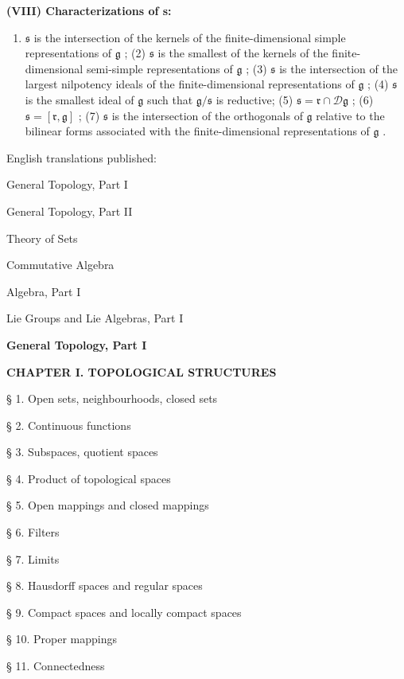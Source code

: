 \textbf{(VIII) Characterizations of s:}

\begin{enumerate}
\def\labelenumi{(\arabic{enumi})}
\tightlist
\item
  \(\mathfrak{s}\) is the intersection of the kernels of the finite-dimensional simple representations of \(\mathfrak{g}\) ; (2) \(\mathfrak{s}\) is the smallest of the kernels of the finite-dimensional semi-simple representations of \(\mathfrak{g}\) ; (3) \(\mathfrak{s}\) is the intersection of the largest nilpotency ideals of the finite-dimensional representations of \(\mathfrak{g}\) ; (4) \(\mathfrak{s}\) is the smallest ideal of \(\mathfrak{g}\) such that \(\mathfrak{g} / \mathfrak{s}\) is reductive; (5) \(\mathfrak{s} = \mathfrak{r} \cap \mathcal{D}\mathfrak{g}\) ; (6) \(\mathfrak{s} = [\mathfrak{r}, \mathfrak{g}]\) ; (7) \(\mathfrak{s}\) is the intersection of the orthogonals of \(\mathfrak{g}\) relative to the bilinear forms associated with the finite-dimensional representations of \(\mathfrak{g}\) .
\end{enumerate}



English translations published:

General Topology, Part I

General Topology, Part II

Theory of Sets

Commutative Algebra

Algebra, Part I

Lie Groups and Lie Algebras, Part I

\textbf{General Topology, Part I}

\textbf{CHAPTER I. TOPOLOGICAL STRUCTURES}

§ 1. Open sets, neighbourhoods, closed sets

§ 2. Continuous functions

§ 3. Subspaces, quotient spaces

§ 4. Product of topological spaces

§ 5. Open mappings and closed mappings

§ 6. Filters

§ 7. Limits

§ 8. Hausdorff spaces and regular spaces

§ 9. Compact spaces and locally compact spaces

§ 10. Proper mappings

§ 11. Connectedness

